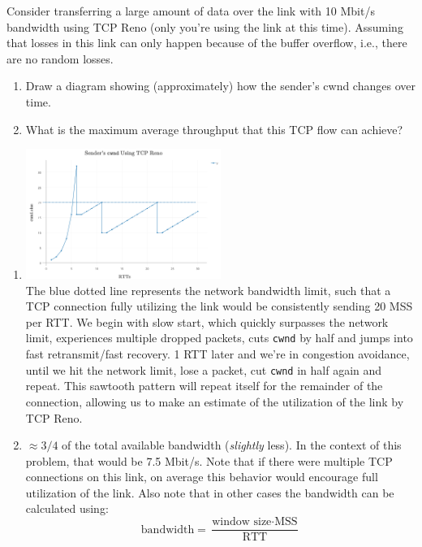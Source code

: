 \documentclass{report}
\begin{document}
\clearpage
\begin{problem}

Consider transferring a large amount of data over the link with 10 Mbit/s
bandwidth using TCP Reno (only you're using the link at this time). Assuming
that losses in this link can only happen because of the buffer overflow, i.e.,
there are no random losses.
\begin{enumerate}
	\item Draw a diagram showing (approximately) how the sender’s cwnd changes
        over time.
	\item What is the maximum average throughput that this TCP flow can achieve?
\end{enumerate}

\begin{answer}{40em}
  \begin{enumerate}
    \item \includegraphics[valign=t,width=0.5\textwidth]{TCP-RENO}\\
          The blue dotted line represents the network bandwidth limit, such that
          a TCP connection fully utilizing the link would be consistently
          sending 20 MSS per RTT. We begin with slow start, which quickly
          surpasses the network limit, experiences multiple dropped packets,
          cuts \texttt{cwnd} by half and jumps into fast retransmit/fast
          recovery. 1 RTT later and we're in congestion avoidance, until we hit
          the network limit, lose a packet, cut \texttt{cwnd} in half again and
          repeat. This sawtooth pattern will repeat itself for the remainder of
          the connection, allowing us to make an estimate of the utilization of the link by TCP Reno.
    \item $\approx 3/4$ of the total available bandwidth (\textit{slightly}
           less). In the context of this problem, that would be 7.5 Mbit/s.
           Note that if there were multiple TCP connections on this link, on
           average this behavior would encourage full utilization of the link.
           Also note that in other cases the bandwidth can be calculated using:
             $$\text{bandwidth} = \frac{\text{window size}\cdot\text{MSS}}{\text{RTT}}$$
  \end{enumerate}
\end{answer}

\end{problem}
\end{document}
